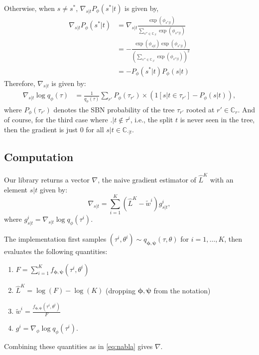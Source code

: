 \documentclass{article}
\begin{document}
Otherwise, when $s \not= s^*$, $\nabla_{s|t} P_{\phi}(s^*|t)$ is given by,
\begin{align*}
    \nabla_{s|t} P_{\phi}(s^*|t) &= \nabla_{s|t} \frac{\exp(\phi_{s^*|t})}{\sum\limits_{s'' \in \mathbb{C}_{.|t}} \exp(\phi_{s''|t})} \\
    &= - \frac{\exp(\phi_{s|t}) \exp(\phi_{s^*|t})}{\left(\sum\limits_{s'' \in \mathbb{C}_{.|t}} \exp(\phi_{s''|t})\right)^2} \\
    &= - P_{\phi}(s^*|t) P_{\phi}(s|t)
\end{align*}
Therefore, $\nabla_{s|t}$ is given by:
\begin{align*}
    \nabla_{s|t} \log q_{\phi}(\tau)
    &= \frac{1}{q_{\phi}(\tau)} \sum\limits_{r'} P_{\phi}(\tau_{r'}) \times \left(1[s|t \in \tau_{r'}] - P_{\phi}(s|t)\right),
\end{align*}
where $P_{\phi}(\tau_{r'})$ denotes the SBN probability of the tree $\tau_{r'}$ rooted at $r' \in \mathbb{C}_r$. And of course, for the third case where $. | t \notin \tau^i$, i.e., the split $t$ is never seen in the tree, then the gradient is just $0$ for all $s | t \in \mathbb{C}_{\cdot|t}$.


\subsection*{Computation}
Our library returns a vector $\nabla$, the naive gradient estimator of $\hat{L}^K$ with an element $s|t$ given by:
\begin{equation}\label{eq:nabla}
    \nabla_{s|t} = \sum\limits_{i=1}^{K} (\hat{L}^K - \tilde{w}^i) g_{s|t}^i,
\end{equation}
where $g_{s|t}^i = \nabla_{s|t} \log q_{\phi}(\tau^i)$.

The implementation first samples $(\tau^i, \theta^i) \sim q_{\bm{\phi}, \bm{\psi}}(\tau, \theta)$ for $i = 1, \ldots, K$, then evaluates the following quantities:
\begin{enumerate}
    \item $F = \sum_{i=1}^{K} f_{\bm{\phi},\bm{\psi}}(\tau^i, \theta^i)$
    \item $\hat{L}^{K} = \log(F) - \log(K)$ (dropping $\bm{\phi}, \bm{\psi}$ from the notation)
    \item $\tilde{w}^i = \frac{f_{\bm{\phi},\bm{\psi}}(\tau^i, \theta^i)}{F}$
    \item $g^i = \nabla_{\phi} \log q_{\phi}(\tau^i)$.
\end{enumerate}
Combining these quantities as in \eqref{eq:nabla} gives $\nabla$.
\end{document}
